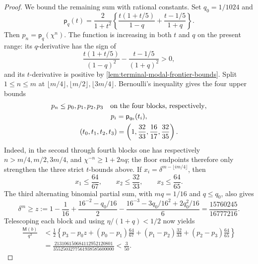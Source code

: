 \begin{proof}
We bound the remaining sum with rational constants.  Set $q_0=1/1024$ and
\begin{equation}
 \mathsf p_q(t)=\frac{2}{1+t^2}\left\{
 \frac{t(1+t/5)}{1-q}+\frac{t-1/5}{1+q}\right\}.
 \label{eq:terminal-modal-static-frontier-function}
\end{equation}
Then $p_n=\mathsf p_q(\chi^n)$.  The function is increasing in both $t$
and $q$ on the present range: its $q$-derivative has the sign of
\[
 \frac{t(1+t/5)}{(1-q)^2}
 -\frac{t-1/5}{(1+q)^2}>0,
\]
and its $t$-derivative is positive by
\cref{lem:terminal-modal-frontier-bounds}.  Split $1\le n\le m$ at
$\lfloor m/4\rfloor,\lfloor m/2\rfloor,\lfloor3m/4\rfloor$.  Bernoulli's
inequality gives the four upper bounds
\[
 \begin{gathered}
 p_n\le p_0,p_1,p_2,p_3
 \quad\hbox{on the four blocks, respectively},\\
 p_i=\mathsf p_{q_0}(t_i),\\
 (t_0,t_1,t_2,t_3)=\left(1,\frac{32}{33},
 \frac{16}{17},\frac{32}{35}\right).
 \end{gathered}
\]
Indeed, in the second through fourth blocks one has respectively
$n>m/4,m/2,3m/4$, and
$\chi^{-n}\ge1+2nq$; the floor endpoints therefore only strengthen the
three strict $t$-bounds above.
If $x_i=\delta^{m-\lfloor im/4\rfloor}$, then
\[
 x_1\le\frac{64}{67},\qquad x_2\le\frac{32}{33},
 \qquad x_3\le\frac{64}{65}.
\]
The third alternating binomial partial sum, with $mq=1/16$ and
$q\le q_0$, also gives
\[
 \delta^m\ge z:=1-\frac1{16}
 +\frac{16^{-2}-q_0/16}{2}
 -\frac{16^{-3}-3q_0/16^2+2q_0^2/16}{6}
 =\frac{15760245}{16777216}.
\]
Telescoping each block and using $\eta/(1+q)<1/2$ now yields
\begin{align*}
 \frac{\mathsf M(b)}{q^3}
 &<\frac12\left\{p_3-p_0z
 +(p_0-p_1)\frac{64}{67}
 +(p_1-p_2)\frac{32}{33}
 +(p_2-p_3)\frac{64}{65}\right\}\\
 &=\frac{213106150684112952120801}
 {3552503277561938585600000}<\frac3{50}.
\end{align*}


\end{proof}

